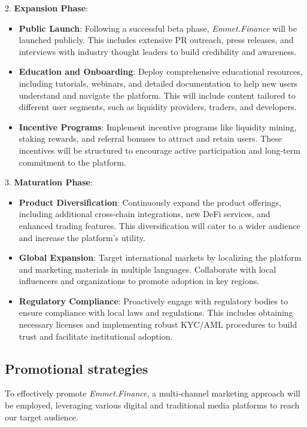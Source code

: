 \documentclass[12pt, a4paper]{article}
\begin{document}
2. \textbf{Expansion Phase}:
   \begin{itemize}
       \item \textbf{Public Launch}: Following a successful beta phase, \textit{Emmet.Finance} will be launched publicly. This includes extensive PR outreach, press releases, and interviews with industry thought leaders to build credibility and awareness.
       \item \textbf{Education and Onboarding}: Deploy comprehensive educational resources, including tutorials, webinars, and detailed documentation to help new users understand and navigate the platform. This will include content tailored to different user segments, such as liquidity providers, traders, and developers.
       \item \textbf{Incentive Programs}: Implement incentive programs like liquidity mining, staking rewards, and referral bonuses to attract and retain users. These incentives will be structured to encourage active participation and long-term commitment to the platform.
   \end{itemize}

3. \textbf{Maturation Phase}:
   \begin{itemize}
       \item \textbf{Product Diversification}: Continuously expand the product offerings, including additional cross-chain integrations, new DeFi services, and enhanced trading features. This diversification will cater to a wider audience and increase the platform's utility.
       \item \textbf{Global Expansion}: Target international markets by localizing the platform and marketing materials in multiple languages. Collaborate with local influencers and organizations to promote adoption in key regions.
       \item \textbf{Regulatory Compliance}: Proactively engage with regulatory bodies to ensure compliance with local laws and regulations. This includes obtaining necessary licenses and implementing robust KYC/AML procedures to build trust and facilitate institutional adoption.
   \end{itemize}

\subsection{Promotional strategies}

To effectively promote \textit{Emmet.Finance}, a multi-channel marketing approach will be employed, leveraging various digital and traditional media platforms to reach our target audience.
\end{document}
